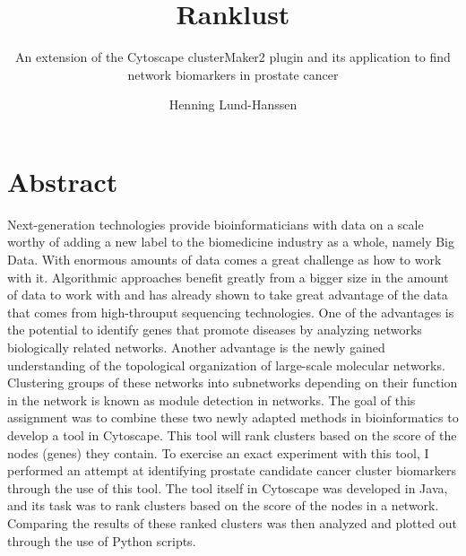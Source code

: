 \documentclass[a4paper,UKenglish]{ifimaster}
\title{Ranklust}
\subtitle{An extension of the Cytoscape clusterMaker2 plugin and its application
to find network biomarkers in prostate cancer}
\author{Henning Lund-Hanssen}
\begin{document}
\duoforside[program={Programming and Networks},
    dept={Department of Informatics},long]

\frontmatter{}
\printglossaries

\setlength{\parskip}{12pt}
\setlength{\parindent}{12pt}

\chapter*{Abstract}
Next-generation technologies provide bioinformaticians with data on a scale
worthy of adding a new label to the biomedicine industry as a whole, namely
Big Data. With enormous amounts of data comes a great challenge as how to work
with it. Algorithmic approaches benefit greatly from a bigger size in the amount
of data to work with and has already shown to take great advantage of the data
that comes from high-throuput sequencing technologies. One of the advantages is
the potential to identify genes that promote diseases by analyzing networks
biologically related networks. Another advantage is the newly gained
understanding of the topological organization of large-scale molecular networks.
Clustering groups of these networks into subnetworks depending on their function
in the network is known as module detection in networks. The goal of this
assignment was to combine these two newly adapted methods in bioinformatics to
develop a tool in Cytoscape. This tool will rank clusters based on the score of
the nodes (genes) they contain. To exercise an exact experiment with this tool,
I performed an attempt at identifying prostate candidate cancer cluster
biomarkers through the use of this tool. The tool itself in Cytoscape was
developed in Java, and its task was to rank clusters based on the score of the
nodes in a network. Comparing the results of these ranked clusters was then
analyzed and plotted out through the use of Python scripts.


\tableofcontents{}
\listoffigures{}
\listoftables{}
\lstlistoflistings

\mainmatter{}





\backmatter{}
\printbibliography
\end{document}
